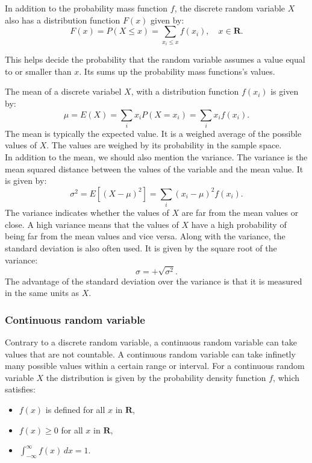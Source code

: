 In addition to the probability mass function $f$, the discrete random variable $X$ also has a distribution function $F(x)$ given by:
$$F(x) = P(X \leq x) = \sum_{x_i \leq x} f(x_i), \quad x \in \textbf{R}.$$

This helps decide the probability that the random variable assumes a value equal to or smaller than $x$. Its sums up the probability mass functions's values.
\newline

The mean of a discrete variabel $X$, with a distribution function $f(x_{i})$ is given by:
$$\mu = E(X) = \sum_i x_i P(X = x_i) = \sum_i x_i f(x_i).$$
The mean is typically the expected value. It is a weighed average of the possible values of $X$. The values are weighed by its probability in the sample space.
\\

In addition to the mean, we should also mention the variance. The variance is the mean squared distance between the values of the variable and the mean value. It is given by:
$$\sigma^2 = E\left[(X - \mu)^2\right] = \sum_{i} (x_i - \mu)^2 f(x_i).$$
The variance indicates whether the values of $X$ are far from the mean values or close. A high variance means that the values of $X$ have a high probability of being far from the mean values and vice versa. Along with the variance, the standard deviation is also often used. It is given by the square root of the variance:
$$\sigma=+\sqrt{\sigma^2}.$$
The advantage of the standard deviation over the variance is that it is measured in the same units as $X$.

\subsubsection{Continuous random variable}
Contrary to a discrete random variable, a continuous random variable can take values that are not countable. A continuous random variable can take infinetly many possible values within a certain range or interval. For a continuous random variable $X$ the distribution is given by the probability density function $f$, which satisfies:

\begin{itemize}
	\item $f(x)$ is defined for all $x$ in $\textbf{R}$,
	\item $f(x) \geq 0$ for all $x$ in $\textbf{R}$,
	\item $\int_{-\infty}^{\infty} f(x) \, dx = 1.$
\end{itemize}


